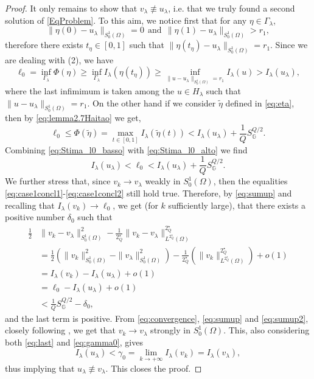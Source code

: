 \documentclass[11pt]{amsart}
\numberwithin{equation}{section} %
\theoremstyle{definition}
\def\G{\mathbb{G}}
\newcommand{\m}{\mbox}
\begin{document}
\begin{proof}
It only remains to show that $v_\lambda\not \equiv u_\lambda$, i.e. that we truly found a second solution of \eqref{EqProblem}.
To this aim, we notice first that for any $\eta\in \Gamma_\lambda$,
\[
\|\eta(0)-u_\lambda\|_{S^{1}_{0}(\Omega)}=0\ \ \m{and}\ \ \|\eta(1)-u_\lambda\|_{S^{1}_{0}(\Omega)}>r_1,
\]
therefore there exists $t_\eta\in [0,1]$
such that $\|\eta(t_\eta)-u_\lambda\|_{S^{1}_{0}(\Omega)}=r_1$.
Since we are dealing with (2),
we have
\begin{equation}\label{eq:Stima_l0_basso}
\ell_0=\inf_{\Gamma_\lambda}\Phi(\eta)\geq\inf_{\Gamma_\lambda}I_\lambda(\eta(t_\eta))
\geq\inf_{\|u-u_\lambda\|_{S^{1}_{0}(\Omega)}=r_1} I_\lambda(u)>I_\lambda(u_\lambda),
\end{equation}
\noindent where the last infimimum is taken among the $u\in H_\lambda$
such that $\|u-u_\lambda\|_{S^{1}_{0}(\Omega)}=r_1$. On the other hand
if we consider $\widetilde\eta$ defined in \eqref{eq:eta},
then by \eqref{eq:lemma2.7Haitao}
we get,
\begin{equation}\label{eq:Stima_l0_alto}
\ell_0\leq \Phi(\widetilde \eta)=\max_{t\in [0,1]}I_\lambda(\widetilde \eta(t))<
I_\lambda(u_\lambda)+\frac{1}{Q}S_\G^{Q\slash2}.
\end{equation}
Combining \eqref{eq:Stima_l0_basso} with \eqref{eq:Stima_l0_alto} we find
\begin{equation}\label{eq:sumup}
	I_\lambda(u_\lambda)<\ell_0<I_\lambda(u_\lambda)+\frac{1}{Q}S_\G^{Q\slash2}.
\end{equation}
We further stress that, since $v_k\to v_\lambda$ weakly in $S^1_0(\Omega)$, then
the equalities \eqref{eq:case1concl1}-\eqref{eq:case1concl2} still hold true.
Therefore, by \eqref{eq:sumup} and recalling that $I_\lambda(v_k)\to \ell_0$,
we get (for $k$ sufficiently large), that there exists a positive number $\delta_{0}$ such that 
\begin{equation}\label{eq:sumup2}
	\begin{split}
		\frac{1}{2}&\|v_k-v_\lambda\|_{S^{1}_{0}(\Omega)}^2-\frac{1}{2^\star_Q}\|v_k-v_\lambda\|_{L^{2^\star_Q}(\Omega)}^{2^\star_Q}\\
		&=\frac{1}{2}(\|v_k\|_{S^{1}_{0}(\Omega)}^2-\|v_\lambda\|_{S^{1}_{0}(\Omega)}^2)-\frac{1}{2^\star_Q}(\|v_k\|^{2^\star_Q}_{L^{2^\star_Q}(\Omega)})+o(1)\\
		&=I_\lambda(v_k)-I_\lambda(u_\lambda)+o(1)\\
		&=\ell_0-I_\lambda(u_\lambda)+o(1)\\
		&<\frac{1}{Q}S_\G^{Q\slash2}-\delta_0,
	\end{split}
\end{equation}
\noindent and the last term is positive.
From \eqref{eq:convergence}, \eqref{eq:sumup} and \eqref{eq:sumup2},
closely following \cite[Proposition 3.1]{Tarantello},
we get that $v_k\to v_\lambda$ strongly in $S^1_0(\Omega)$.
This, also considering both \eqref{eq:last} and \eqref{eq:gamma0}, gives
\[
I_\lambda(u_\lambda)<\gamma_0=\lim_{k\to+\infty}I_\lambda(v_k)=I_\lambda(v_\lambda),
\]
thus implying that $u_\lambda\not\equiv v_\lambda$. This closes the proof.
\end{proof}
\end{document}
